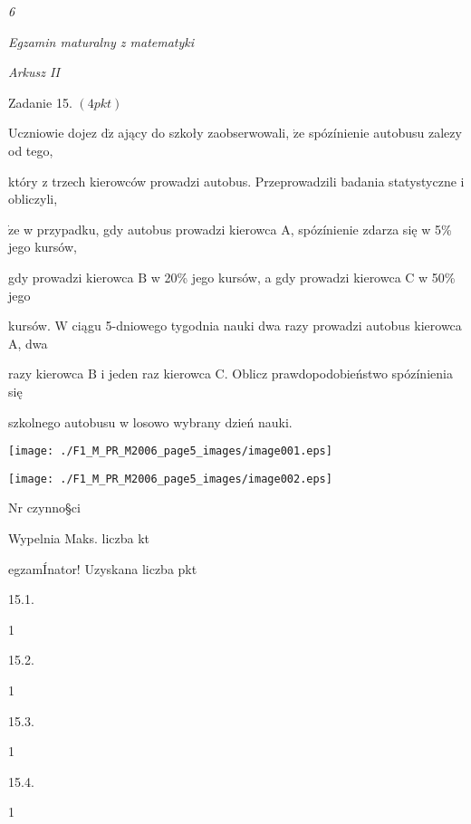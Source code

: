 \documentclass[a4paper,12pt]{article}
\begin{document}
{\it 6}

{\it Egzamin maturalny z matematyki}

{\it Arkusz II}

Zadanie 15. $(4pkt)$

Uczniowie dojez $\mathrm{d}\dot{\mathrm{z}}$ ający do szkoły zaobserwowali, $\dot{\mathrm{z}}\mathrm{e}$ spózínienie autobusu zalez$\mathrm{y}$ od tego,

który z trzech kierowców prowadzi autobus. Przeprowadzili badania statystyczne i obliczyli,

$\dot{\mathrm{z}}\mathrm{e}$ w przypadku, gdy autobus prowadzi kierowca $\mathrm{A}$, spózínienie zdarza się w 5\% jego kursów,

gdy prowadzi kierowca $\mathrm{B}$ w 20\% jego kursów, a gdy prowadzi kierowca $\mathrm{C}$ w 50\% jego

kursów. $\mathrm{W}$ ciągu 5-dniowego tygodnia nauki dwa razy prowadzi autobus kierowca $\mathrm{A}$, dwa

razy kierowca $\mathrm{B}$ i jeden raz kierowca C. Oblicz prawdopodobieństwo spózínienia się

szkolnego autobusu w losowo wybrany dzień nauki.
\begin{center}
\texttt{[image: ./F1\_M\_PR\_M2006\_page5\_images/image001.eps]}

\texttt{[image: ./F1\_M\_PR\_M2006\_page5\_images/image002.eps]}
\end{center}
Nr czynno\S ci

Wypelnia Maks. liczba kt

egzamÍnator! Uzyskana liczba pkt

15.1.

1

15.2.

1

15.3.

1

15.4.

1
\end{document}
